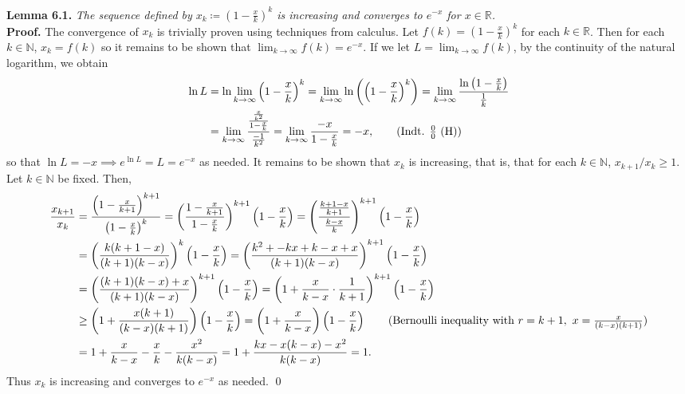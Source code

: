 \noindent \textbf{Lemma 6.1.} \emph{The sequence defined by \( x_{k} \coloneqq (1 - \frac{x}{k})^{k}  \) is increasing and converges to \( e^{-x}  \) for \( x \in \mathbb{R} \).}  \\
\textbf{Proof.} The convergence of \( x_{k}  \) is trivially proven using techniques from calculus. Let \( f(k) = (1- \frac{x}{k} )^{k}  \) for each \( k \in \mathbb{R} \). Then for each \( k \in \mathbb{N}  \), \( x_{k} = f(k) \) so it remains to be shown that \( \lim_{{k} \to {\infty}} f(k) = e^{-x}  \). If we let \( L = \lim_{{k} \to {\infty}} f(k)  \), by the continuity of the natural logarithm, we obtain
\begin{align*}
	\ln L &= \ln \lim_{{k} \to {\infty}} \left ( {1 - \frac{x}{k} } \right )^{k} = \lim_{{k} \to {\infty}} \ln \left (\left ( {1 - \frac{x}{k} } \right )^{k}\right ) = \lim_{{k} \to {\infty}} \frac{\ln \left ( {1 - \frac{x}{k} } \right ) }{\frac{1}{k} } \\
	      &=  \lim_{{k} \to {\infty}} \frac{\frac{\frac{x}{k^{2} } }{1-\frac{x}{k} } }{\frac{-1}{k^{2} } }   = \lim_{{k} \to {\infty}} \frac{-x}{1 - \frac{x}{k} } = -x ,  \tag{Indt. $\frac{0}{0}$ (H)}
\end{align*}
so that \( \ln L = -x \implies e^{\ln L} = L = e^{-x}   \) as needed. It remains to be shown that \( x_{k}  \) is increasing, that is, that for each \( k \in \mathbb{N} \), \( x_{k+1} / x_{k} \geq 1  \). Let \( k \in \mathbb{N}  \) be fixed. Then,
\begin{align*}
	\frac{x_{k+1} }{x_{k} }  &= \frac{\left ( {1 - \frac{x}{k+1} } \right ) ^{k+1} }{\left ( {1 - \frac{x}{k} } \right ) ^{k} } = \left ( {\frac{1 - \frac{x}{k+1} }{1 - \frac{x}{k} } } \right ) ^{k+1} \left ( {1 - \frac{x}{k} } \right ) = \left ( {\frac{\frac{k+1-x}{k+1} }{\frac{k-x}{k} } } \right )^{k+1} \left ( {1 - \frac{x}{k} } \right ) \\
				 &= \left ( {\frac{k(k+1 - x)}{(k+1) (k - x)}} \right )^{k} \left ( {1 - \frac{x}{k} } \right )  = \left ( {\frac{k^2 + -kx +k - x + x}{(k+1)(k - x)  }} \right )^{k+1} \left ( {1 - \frac{x}{k} } \right )   \\
				 &= \left ( {\frac{(k+1)(k - x) +  x}{(k+1)(k-x) }} \right )^{k+1} \left ( {1 - \frac{x}{k} } \right )  = \left ( {1 + \frac{x}{k - x}\cdot\frac{1}{k+1} } \right )^{k+1} \left ( {1 - \frac{x}{k} } \right ) \\
				 &\geq \left ( {1 + \frac{x(k+1)}{(k-x)(k+1)} } \right ) \left ( {1- \frac{x}{k} } \right ) = \left ( {1 + \frac{x}{k-x} } \right )\left ( {1 - \frac{x}{k} } \right ) \tag {Bernoulli inequality with $r = k+1, \ x = \frac{x}{(k-x)(k+1)}$} \\
				 &= 1 + \frac{x}{k-x} - \frac{x}{k} - \frac{x^{2} }{k(k-x)} = 1 + \frac{kx - x(k-x) - x^{2} }{k(k-x)} = 1. 
\end{align*}
Thus \( x_{k}  \) is increasing and converges to \( e^{-x}  \) as needed. \qed
